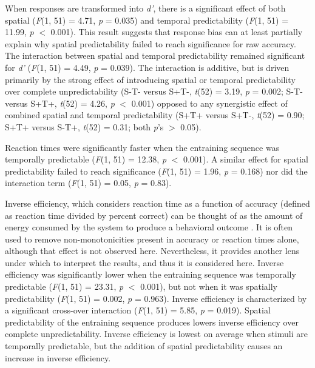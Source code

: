 \documentclass[dwyatte_dissertation.tex]{subfiles}
\begin{document}
When responses are transformed into \textit{d'}, there is a significant effect of both spatial (\textit{F}(1, 51) = 4.71, \textit{p} = 0.035) and temporal predictability (\textit{F}(1, 51) = 11.99, \textit{p} $<$ 0.001). This result suggests that response bias can at least partially explain why spatial predictability failed to reach significance for raw accuracy. The interaction between spatial and temporal predictability remained significant for \textit{d'} (\textit{F}(1, 51) = 4.49, \textit{p} = 0.039). The interaction is additive, but is driven primarily by the strong effect of introducing spatial or temporal predictability over complete unpredictability (S-T- versus S+T-, \textit{t}(52) = 3.19, \textit{p} = 0.002; S-T- versus S+T+, \textit{t}(52) = 4.26, \textit{p} $<$ 0.001) opposed to any synergistic effect of combined spatial and temporal predictability (S+T+ versus S+T-, \textit{t}(52) = 0.90; S+T+ versus S-T+, \textit{t}(52) = 0.31; both \textit{p}'s $>$ 0.05).

Reaction times were significantly faster when the entraining sequence was temporally predictable (\textit{F}(1, 51) = 12.38, \textit{p} $<$ 0.001). A similar effect for spatial predictability failed to reach significance (\textit{F}(1, 51) = 1.96, \textit{p} = 0.168) nor did the interaction term (\textit{F}(1, 51) = 0.05, \textit{p} = 0.83).

Inverse efficiency, which considers reaction time as a function of accuracy (defined as reaction time divided by percent correct) can be thought of as the amount of energy consumed by the system to produce a behavioral outcome \cite{TownshendAshby83}. It is often used to remove non-monotonicities present in accuracy or reaction times alone, although that effect is not observed here. Nevertheless, it provides another lens under which to interpret the results, and thus it is considered here. Inverse efficiency was significantly lower when the entraining sequence was temporally predictable (\textit{F}(1, 51) = 23.31, \textit{p} $<$ 0.001), but not when it was spatially predictability (\textit{F}(1, 51) = 0.002, \textit{p} = 0.963). Inverse efficiency is characterized by a significant cross-over interaction (\textit{F}(1, 51) = 5.85, \textit{p} = 0.019). Spatial predictability of the entraining sequence produces lowers inverse efficiency over complete unpredictability. Inverse efficiency is lowest on average when stimuli are temporally predictable, but the addition of spatial predictability causes an increase in inverse efficiency.

\end{document}
